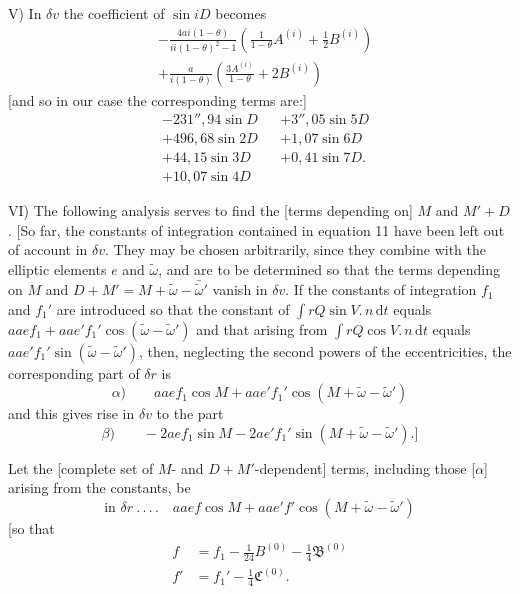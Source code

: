 V) In \(\delta v\) the coefficient of \(\sin iD\) becomes
\[
\begin{aligned}
&-\frac{4ai(1-\theta)}{ii(1-\theta)^2-1}\left(\frac1{1-\theta}A^{(i)}+\tfrac12B^{(i)}\right)\\
&+\frac a{i(1-\theta)}\left(\frac{3A^{(i)}}{1-\theta}+2B^{(i)}\right)
\end{aligned}
\]
[and so in our case the corresponding terms are:]
\[
\begin{aligned}
&-231''{,}94\sin D&&+3''{,}05\sin5D\\
&+496{,}68\sin2D&&+1{,}07\sin6D\\
&+44{,}15\sin3D&&+0{,}41\sin7D.\\
&+10{,}07\sin4D
\end{aligned}
\]

VI) The following analysis serves to find the [terms depending on] \(M\) and \(M'+D\). [So far, the constants of integration contained in equation 11 have been left out of account in \(\delta v\). They may be chosen arbitrarily, since they combine with the elliptic elements \(e\) and \(\tilde\omega\), and are to be determined so that the terms depending on \(M\) and \(D+M'=M+\tilde\omega-\bar{\tilde\omega}'\) vanish in \(\delta v\). If the constants of integration \(f_1\) and \(f_1'\) are introduced so that the constant of \(\int rQ\sin V\mathord{.}\,n\,\mathrm{d}t\) equals \(aaef_1+aae'f_1'\cos(\tilde\omega-\tilde\omega')\) and that arising from \(\int rQ\cos V\mathord{.}\,n\,\mathrm{d}t\) equals \(aae'f_1'\sin(\tilde\omega-\tilde\omega')\), then, neglecting the second powers of the eccentricities, the corresponding part of \(\delta r\) is
\[
\alpha)\qquad aaef_1\cos M+aae'f_1'\cos(M+\tilde\omega-\tilde\omega')
\]
and this gives rise in \(\delta v\) to the part
\[
\beta)\qquad-2aef_1\sin M-2ae'f_1'\sin(M+\tilde\omega-\tilde\omega').]
\]

Let the [complete set of \(M\)- and \(D+M'\)-dependent] terms, including those [\(\alpha\)] arising from the constants, be
\hypertarget{native-399}{}
\[
\text{in }\delta r\ .\, .\, .\, .\quad aaef\cos M+aae'f'\cos(M+\tilde\omega-\tilde\omega')
\]
[so that
\[
\begin{aligned}
f&=f_1-\tfrac1{24}B^{(0)}-\tfrac14\mathfrak B^{(0)}\\
f'&=f_1'-\tfrac14\mathfrak C^{(0)}.
\end{aligned}
\]

